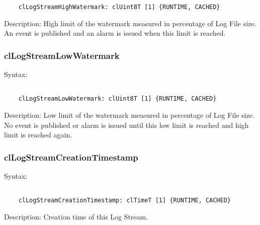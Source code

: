 \begin{flushleft}
\begin{Desc}
\begin{verbatim}
	clLogStreamHighWatermark: clUint8T [1] {RUNTIME, CACHED}
	\end{verbatim}
	\normalsize
\end{Desc}

\begin{Desc}
 \item[Description:]
High limit of the watermark measured in percentage of Log File size. An event is published and an alarm is issued when this limit is reached.
\end{Desc}



\subsubsection{clLogStreamLowWatermark}
\begin{Desc}
\item[Syntax:]
\footnotesize\begin{verbatim}        	

	clLogStreamLowWatermark: clUint8T [1] {RUNTIME, CACHED}
	\end{verbatim}
	\normalsize
\end{Desc}

\begin{Desc}
 \item[Description:]
Low limit of the watermark measured in percentage of Log File size. No event
is published or alarm is issued until this low limit is reached and high limit is reached again.
\end{Desc}



\subsubsection{clLogStreamCreationTimestamp}
\begin{Desc}
\item[Syntax:]
\footnotesize\begin{verbatim}        	

	clLogStreamCreationTimestamp: clTimeT [1] {RUNTIME, CACHED}
	\end{verbatim}
	\normalsize
\end{Desc}

\begin{Desc}
 \item[Description:]
Creation time of this Log Stream.
\end{Desc}




\end{flushleft}
